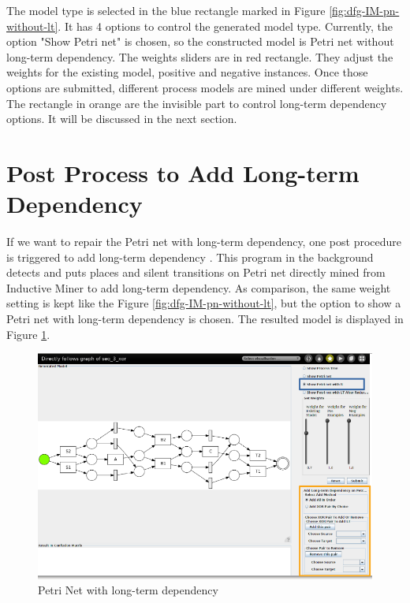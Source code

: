 The model type is selected in the blue rectangle marked in Figure \ref{fig:dfg-IM-pn-without-lt}. It has 4 options to control the generated model type. Currently, the option "Show Petri net" is chosen, so the constructed model is Petri net without long-term dependency. The weights sliders are in red rectangle. They adjust the weights for the existing model, positive and negative instances. Once those options are submitted, different process models are mined under different weights. The rectangle in orange are the invisible part to control long-term dependency options. It will be discussed in the next section.

\section{Post Process to Add Long-term Dependency }
If we want to repair the Petri net with long-term dependency, one post procedure is triggered to add long-term dependency . This program in the background detects and puts places and silent transitions on Petri net directly mined from Inductive Miner to add long-term dependency. As comparison, the same weight setting is kept like the Figure \ref{fig:dfg-IM-pn-without-lt}, but the option to show a Petri net with long-term dependency is chosen. The resulted model is displayed in  Figure \ref{fig:dfg-IM-pn-with-lt}. 
\begin{figure}
	\centering
	\includegraphics[width=\textwidth]{figures/implementation/dfg-IM-pn-with-lt.png}
	\caption{Petri Net with long-term dependency }
	\label{fig:dfg-IM-pn-with-lt}
\end{figure}

